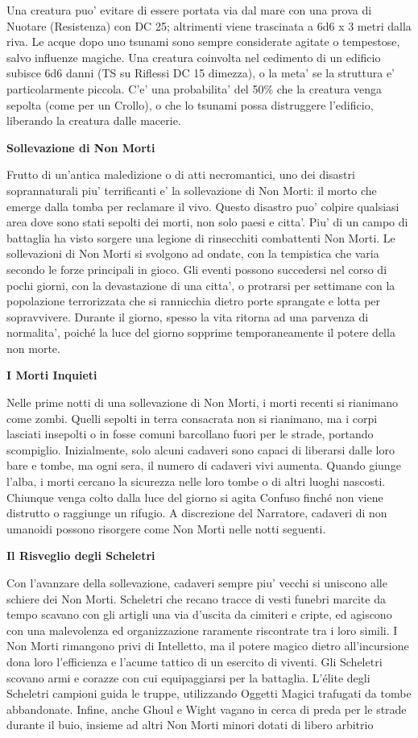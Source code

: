 \documentclass[a4paper,11pt,twoside,openany]{book}
\begin{document}
{		Una creatura puo' evitare di essere portata via dal mare con una prova di Nuotare (Resistenza) con DC 25; altrimenti viene trascinata a 6d6 x 3 metri dalla riva. Le acque dopo uno tsunami sono sempre considerate agitate o tempestose, salvo influenze magiche. Una creatura coinvolta nel cedimento di un edificio subisce 6d6 danni (TS su Riflessi DC 15 dimezza), o la meta' se la struttura e' particolarmente piccola. C'e' una probabilita' del 50\% che la creatura venga sepolta (come per un Crollo), o che lo tsunami possa distruggere l'edificio, liberando la creatura dalle macerie.
		
		\textbf{Sollevazione di Non Morti}
		
		Frutto di un'antica maledizione o di atti necromantici, uno dei disastri soprannaturali piu' terrificanti e' la sollevazione di Non Morti: il morto che emerge dal­la tomba per reclamare il vivo. Questo disastro puo' colpire qualsiasi area dove sono stati sepolti dei morti, non solo paesi e citta'. Piu' di un campo di battaglia ha visto sorgere una legione di rinsecchiti combattenti Non Morti. Le sollevazioni di Non Morti si svolgono ad ondate, con la tempistica che varia secondo le forze principali in gioco. Gli eventi possono succedersi nel corso di pochi giorni, con la devastazione di una citta', o protrarsi per settimane con la popolazione terrorizzata che si rannicchia dietro porte sprangate e lotta per sopravvivere. Durante il giorno, spesso la vita ritorna ad una parvenza di normalita', poiché la luce del giorno sopprime temporaneamente il potere della non morte.
		
		\textbf{I Morti Inquieti}
		
		Nelle prime notti di una sollevazione di Non Morti, i morti recenti si rianimano come zombi. Quelli sepolti in terra consacrata non si rianimano, ma i corpi lasciati insepolti o in fosse comuni barcollano fuori per le strade, portando scompiglio. Inizialmente, solo alcuni cadaveri sono capaci di liberarsi dal­le loro bare e tombe, ma ogni sera, il numero di cadaveri vivi aumenta. Quando giunge l'alba, i morti cercano la sicurezza nelle loro tombe o di altri luoghi nascosti. Chiunque venga colto dalla luce del giorno si agita Confuso finché non viene distrutto o raggiunge un rifugio. A discrezione del Narratore, cadaveri di non umanoidi possono risorgere come Non Morti nelle notti seguenti.
		
		\textbf{Il Risveglio degli Scheletri}
		
		Con l'avanzare della sollevazione, cadaveri sempre piu' vecchi si uniscono alle schiere dei Non Morti. Scheletri che recano tracce di vesti funebri marcite da tempo scavano con gli artigli una via d'uscita da cimiteri e cripte, ed agiscono con una malevolenza ed organizzazione raramente riscontrate tra i loro simili. I Non Morti rimangono privi di Intelletto, ma il potere magico dietro all'incursione dona loro l'efficienza e l'acume tattico di un esercito di viventi. Gli Scheletri scovano armi e corazze con cui equipaggiarsi per la battaglia. L'élite degli Scheletri campioni guida le truppe, utilizzando Oggetti Magici trafugati da tombe abbandonate. Infine, anche Ghoul e Wight vagano in cerca di preda per le strade durante il buio, insieme ad altri Non Morti minori dotati di libero arbitrio
		
}
\end{document}
